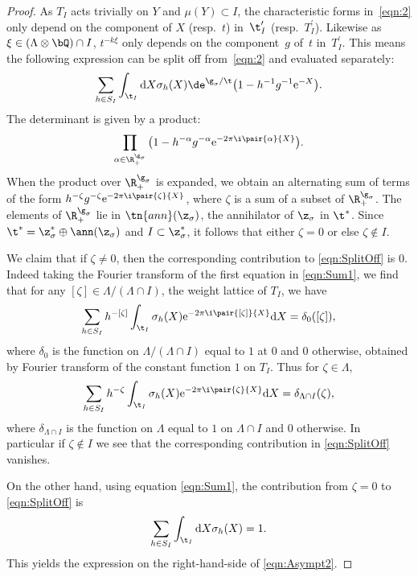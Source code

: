 \begin{proof}As $T_I$ acts trivially on $Y$ and $\mu(Y)\subset I$, the characteristic forms in~\eqref{eqn:2} only depend on the component of $X$ (resp.~$t$) in~$\t_I^\prime$ (resp.~$T_I^\prime$). Likewise as $\xi \in (\Lambda \otimes \bQ) \cap I$, $t^{-k\xi}$ only depends on the component~$g$ of~$t$ in~$T_I^\prime$. This means the following expression can be split off from~\eqref{eqn:2} and evaluated separately:
\begin{gather}\label{eqn:SplitOff}
\sum_{h \in S_I}\int_{\t_I}{\rm d} X \sigma_h(X)\de^{\g_\sigma/\t}\big(1-h^{-1}g^{-1}{\rm e}^{-X}\big).
\end{gather}
The determinant is given by a product:
\[ \prod_{\alpha \in \R_+^{\g_\sigma}} \big(1-h^{-\alpha}g^{-\alpha}{\rm e}^{-2\pi \i \pair{\alpha}{X}}\big).\]
When the product over $\R_+^{\g_\sigma}$ is expanded, we obtain an alternating sum of terms of the form $h^{-\zeta}g^{-\zeta}{\rm e}^{-2\pi \i \pair{\zeta}{X}}$, where $\zeta$ is a sum of a subset of $\R_+^{\g_\sigma}$. The elements of $\R_+^{\g_\sigma}$ lie in $\tn{ann}(\z_\sigma)$, the annihilator of $\z_\sigma$ in $\t^\ast$. Since $\t^\ast=\z_\sigma^\ast\oplus \ann(\z_\sigma)$ and $I \subset \z_\sigma^\ast$, it follows that either $\zeta=0$ or else $\zeta \notin I$.

We claim that if $\zeta \ne 0$, then the corresponding contribution to \eqref{eqn:SplitOff} is $0$. Indeed taking the Fourier transform of the first equation in \eqref{eqn:Sum1}, we find that for any $[\zeta] \in \Lambda/(\Lambda \cap I)$, the weight lattice of $T_I$, we have
\[ \sum_{h \in S_I} h^{-[\zeta]}\int_{\t_I}\sigma_h(X){\rm e}^{-2\pi \i\pair{[\zeta]}{X}}{\rm d}X=\delta_0([\zeta]),\]
where $\delta_0$ is the function on $\Lambda/(\Lambda \cap I)$ equal to $1$ at $0$ and $0$ otherwise, obtained by Fourier transform of the constant function $1$ on $T_I$. Thus for $\zeta \in \Lambda$,
\begin{gather*}
\sum_{h \in S_I} h^{-\zeta}\int_{\t_I}\sigma_h(X){\rm e}^{-2\pi \i\pair{\zeta}{X}}{\rm d} X=\delta_{\Lambda \cap I}(\zeta),
\end{gather*}
where $\delta_{\Lambda \cap I}$ is the function on $\Lambda$ equal to $1$ on $\Lambda \cap I$ and $0$ otherwise. In particular if $\zeta \notin I$ we see that the corresponding contribution in \eqref{eqn:SplitOff} vanishes.

On the other hand, using equation \eqref{eqn:Sum1}, the contribution from $\zeta=0$ to \eqref{eqn:SplitOff} is
\[ \sum_{h \in S_I}\int_{\t_I}{\rm d} X \sigma_h(X)=1. \]
This yields the expression on the right-hand-side of \eqref{eqn:Asympt2}.
\end{proof}

